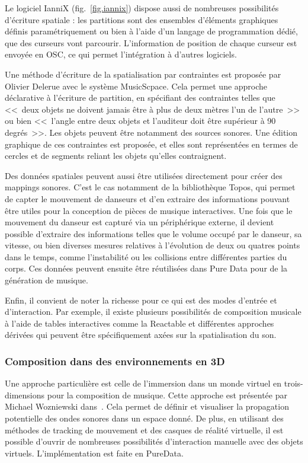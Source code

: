 \documentclass[french,12pt]{article}
\begin{document}
Le logiciel IanniX\cite{jacquemin_iannix_2012} (fig.~\ref{fig.iannix}) dispose aussi de nombreuses possibilités d'écriture spatiale : les partitions sont des ensembles d'éléments graphiques définis paramétriquement ou bien à l'aide d'un langage de programmation dédié, que des curseurs vont parcourir. L'information de position de chaque curseur est envoyée en OSC, ce qui permet l'intégration à d'autres logiciels.

Une méthode d'écriture de la spatialisation par contraintes est proposée par Olivier Delerue avec le système MusicScpace\cite{delerue_spatialisation_2004}. Cela permet une approche déclarative à l'écriture de partition, en spécifiant des contraintes telles que <<~deux objets ne doivent jamais être à plus de deux mètres l'un de l'autre~>> ou bien <<~l'angle entre deux objets et l'auditeur doit être supérieur à 90 degrés~>>. Les objets peuvent être notamment des sources sonores. Une édition graphique de ces contraintes est proposée, et elles sont représentées en termes de cercles et de segments reliant les objets qu'elles contraignent.

Des données spatiales peuvent aussi être utilisées directement pour créer des mappings sonores. C'est le cas notamment de la bibliothèque Topos\cite{naveda_topos_2014}, qui permet de capter le mouvement de danseurs et d'en extraire des informations pouvant être utiles pour la conception de pièces de musique interactives. Une fois que le mouvement du danseur est capturé via un périphérique externe, il devient possible d'extraire des informations telles que le volume occupé par le danseur, sa vitesse, ou bien diverses mesures relatives à l'évolution de deux ou quatres points dans le temps, comme l'instabilité ou les collisions entre différentes parties du corps. Ces données peuvent ensuite être réutilisées dans Pure Data pour de la génération de musique.

Enfin, il convient de noter la richesse pour ce qui est des modes d'entrée et d'interaction. Par exemple, il existe plusieurs possibilités de composition musicale à l'aide de tables interactives comme la Reactable\cite{kaltenbranner_reactable:_2006} et différentes approches dérivées qui peuvent être spécifiquement axées sur la spatialisation du son\cite{sasamoto_controlling_2013}.

\subsubsection{Composition dans des environnements en 3D}
Une approche particulière est celle de l'immersion dans un monde virtuel en trois-dimensions pour la composition de musique. Cette approche est présentée par Michael Wozniewski dans~\cite{wozniewski_framework_2006}. Cela permet de définir et visualiser la propagation potentielle des ondes sonores dans un espace donné. De plus, en utilisant des méthodes de tracking de mouvement et des casques de réalité virtuelle, il est possible d'ouvrir de nombreuses possibilités d'interaction manuelle avec des objets virtuels. L'implémentation est faite en PureData.
\end{document}
